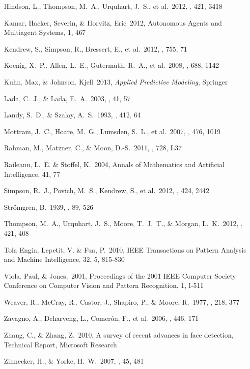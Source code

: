 \documentclass[preprint]{aastex}
\begin{document}
\begin{thebibliography}{16}
 Hindson, L., Thompson, 
M.~A., Urquhart, J.~S., et al.\ 2012, \mnras, 421, 3418 

 Kamar, Hacker, Severin, \& Horvitz, Eric\ 2012, Autonomous Agents and Multiagent Systems, 1, 467

 Kendrew, S., Simpson, 
R., Bressert, E., et al.\ 2012, \apj, 755, 71 

 Koenig, X.~P., Allen, 
L.~E., Gutermuth, R.~A., et al.\ 2008, \apj, 688, 1142 

 Kuhn, Max, \& Johnson, Kjell\ 2013, \textit{Applied Predictive Modeling}, Springer

 Lada, C.~J., \& Lada, E.~A.\ 2003, \araa, 41, 57 

 Landy, S.~D., \& Szalay, A.~S.\ 1993, \apj, 412, 64 

 Mottram, J.~C., Hoare, M.~G., Lumsden, S.~L., et al.\ 2007, \aap, 476, 1019 

 Rahman, M., Matzner, C., 
\& Moon, D.-S.\ 2011, \apjl, 728, L37 

 Raileanu, L.~E. \& Stoffel, K.\ 2004, Annals of Mathematics and Artificial Intelligence, 41, 77

 Simpson, R.~J., Povich, 
M.~S., Kendrew, S., et al.\ 2012, \mnras, 424, 2442 

 Str{\"o}mgren, B.\ 1939, 
\apj, 89, 526 

 Thompson, M.~A., 
Urquhart, J.~S., Moore, T.~J.~T., \& Morgan, L.~K.\ 2012, \mnras, 421, 408 

Tola Engin, Lepetit, V. \& Fua, P.\ 2010, IEEE Transactions on Pattern Analysis and Machine Intelligence, 32, 5, 815-830

Viola, Paul, \& Jones,\ 2001, Proceedings of the 2001 IEEE Computer Society Conference on Computer Vision and Pattern Recognition, 1, I-511

 Weaver, R., McCray, R., 
Castor, J., Shapiro, P., \& Moore, R.\ 1977, \apj, 218, 377 

 Zavagno, A., Deharveng, L., Comer{\'o}n, F., et al.\ 2006, \aap, 446, 171 

Zhang, C., \& Zhang, Z.\ 2010, A survey of recent advances in face detection, Technical Report, Microsoft Research

 Zinnecker, H., \& Yorke, H.~W.\ 2007, \araa, 45, 481 

\end{thebibliography}
\end{document}
